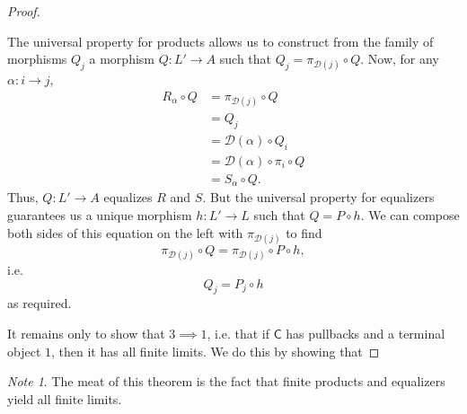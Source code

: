 \documentclass[a4paper,10pt]{scrreprt}
\theoremstyle{definition}
\theoremstyle{plain}
\theoremstyle{remark}
\newtheorem{note}{Note}[section]
\begin{document}
\begin{proof}
\begin{enumerate}
      The universal property for products allows us to construct from the family of morphisms $Q_{j}$ a morphism $Q\colon L' \to A$ such that $Q_{j} = \pi_{\mathcal{D}(j)} \circ Q$. Now, for any $\alpha\colon i \to j$,
      \begin{align*}
        R_{\alpha} \circ Q &= \pi_{\mathcal{D}(j)} \circ Q \\
        &= Q_{j} \\
        &= \mathcal{D}(\alpha) \circ Q_{i} \\
        &= \mathcal{D}(\alpha) \circ \pi_{i} \circ Q \\
        &= S_{\alpha} \circ Q.
      \end{align*}
      Thus, $Q\colon L' \to A$ equalizes $R$ and $S$. But the universal property for equalizers guarantees us a unique morphism $h\colon L' \to L$ such that $Q = P \circ h$. We can compose both sides of this equation on the left with $\pi_{\mathcal{D}(j)}$ to find
      \begin{equation*}
        \pi_{\mathcal{D}(j)} \circ Q = \pi_{\mathcal{D}(j)} \circ P \circ h,
      \end{equation*}
      i.e.
      \begin{equation*}
        Q_{j} = P_{j} \circ h
      \end{equation*}
      as required.
  \end{enumerate}

  It remains only to show that $3 \implies 1$, i.e. that if $\mathsf{C}$ has pullbacks and a terminal object $1$, then it has all finite limits. We do this by showing that 
\end{proof}

\begin{note}
  The meat of this theorem is the fact that finite products and equalizers yield all finite limits.
\end{note}
\end{document}
